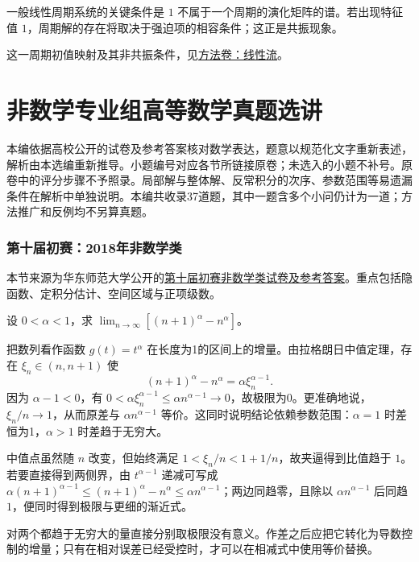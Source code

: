 \documentclass[12pt,fontset=fandol]{ctexart}
\begin{document}
\begin{remark}[方法与条件]一般线性周期系统的关键条件是 $1$ 不属于一个周期的演化矩阵的谱。若出现特征值 $1$，周期解的存在将取决于强迫项的相容条件；这正是共振现象。

这一周期初值映射及其非共振条件，见\hyperref[app:dynamics-flow]{方法卷：线性流}。\end{remark}

\part{非数学专业组高等数学真题选讲}

本编依据高校公开的试卷及参考答案核对数学表达，题意以规范化文字重新表述，解析由本选编重新推导。小题编号对应各节所链接原卷；未选入的小题不补号。原卷中的评分步骤不予照录。局部解与整体解、反常积分的次序、参数范围等易遗漏条件在解析中单独说明。本编共收录37道题，其中一题含多个小问仍计为一道；方法推广和反例均不另算真题。

\section{第十届初赛：2018年非数学类}
本节来源为华东师范大学公开的\href{https://math.ecnu.edu.cn/llin/pdf_files/nonmathans2018.pdf}{第十届初赛非数学类试卷及参考答案}。重点包括隐函数、定积分估计、空间区域与正项级数。

\begin{example}\label{nm-2018-1a}
设 $0<\alpha<1$，求 $\displaystyle\lim_{n\to\infty}[(n+1)^\alpha-n^\alpha]$。
\end{example}
\begin{solve}
把数列看作函数 $g(t)=t^\alpha$ 在长度为1的区间上的增量。由拉格朗日中值定理，存在 $\xi_n\in(n,n+1)$ 使
\[
 (n+1)^\alpha-n^\alpha=\alpha\xi_n^{\alpha-1}.
\]
因为 $\alpha-1<0$，有 $0<\alpha\xi_n^{\alpha-1}\leq\alpha n^{\alpha-1}\to0$，故极限为0。更准确地说，$\xi_n/n\to1$，从而原差与 $\alpha n^{\alpha-1}$ 等价。这同时说明结论依赖参数范围：$\alpha=1$ 时差恒为1，$\alpha>1$ 时差趋于无穷大。

中值点虽然随 $n$ 改变，但始终满足 $1<\xi_n/n<1+1/n$，故夹逼得到比值趋于 $1$。若要直接得到两侧界，由 $t^{\alpha-1}$ 递减可写成 $\alpha(n+1)^{\alpha-1}\le(n+1)^\alpha-n^\alpha\le\alpha n^{\alpha-1}$；两边同趋零，且除以 $\alpha n^{\alpha-1}$ 后同趋 $1$，便同时得到极限与更细的渐近式。

\end{solve}
\begin{remark}
对两个都趋于无穷大的量直接分别取极限没有意义。作差之后应把它转化为导数控制的增量；只有在相对误差已经受控时，才可以在相减式中使用等价替换。
\end{remark}
\end{document}
